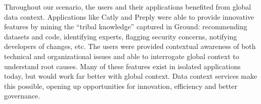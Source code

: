 \documentclass{sig-alternate}
\begin{document}
Throughout our scenario, the users and their applications benefited from global data context. 
Applications like Catly and Preply were able to provide innovative features by mining the ``tribal knowledge'' captured in Ground:
recommending datasets and code, identifying experts, flagging security concerns, notifying developers of changes, etc.
The users were provided contextual awareness of both technical and organizational issues and able to interrogate global context to understand root causes. 
Many of these features exist in isolated applications today, but would work far better with global context. 
Data context services make this possible, opening up opportunities for innovation, efficiency and better governance.




    
    
    
\end{document}
